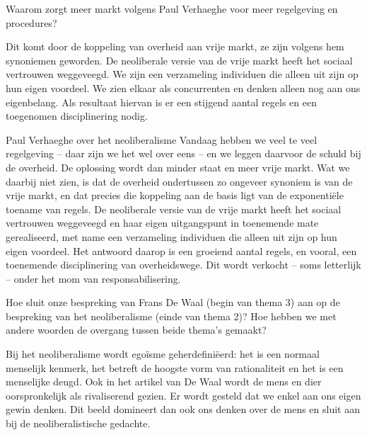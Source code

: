 \documentclass[main.tex]{subfiles}
\begin{document}
\begin{examenvraag}

    \begin{vraag}
        Waarom zorgt meer markt volgens Paul Verhaeghe voor meer regelgeving en procedures?
    \end{vraag}

    \begin{antwoord}
    Dit komt door de koppeling van overheid aan vrije markt, ze zijn volgens hem 
    synoniemen geworden. De neoliberale versie van de vrije markt heeft het 
    sociaal vertrouwen weggeveegd. We zijn een verzameling individuen die alleen 
    uit zijn op hun eigen voordeel.
    We zien elkaar als concurrenten en denken alleen nog aan ons eigenbelang.‭ 
    ‬Als resultaat hiervan is er een stijgend aantal regels en een toegenomen 
    disciplinering nodig.
    \end{antwoord}
    
    \begin{citaat}{Paul Verhaeghe over het neoliberalisme}
	Vandaag hebben we veel te veel regelgeving – daar zijn we het wel
	over eens – en we leggen daarvoor de schuld bij de overheid. De oplossing 
	wordt dan minder staat en meer vrije markt. Wat we daarbij niet zien, is dat 	
	de overheid ondertussen zo ongeveer synoniem is van de vrije markt, en dat 
	precies die koppeling aan de basis ligt van de exponentiële toename van
	regels. De neoliberale versie van de vrije markt heeft het sociaal vertrouwen 
	weggeveegd en haar eigen uitgangspunt in toenemende mate gerealiseerd, met 
	name een verzameling individuen die alleen uit zijn op hun eigen voordeel. Het 
	antwoord daarop is een groeiend aantal regels, en vooral, een
	toenemende disciplinering van overheidswege. Dit wordt verkocht – soms
	letterlijk – onder het mom van responsabilisering.
    \end{citaat}
\end{examenvraag}


\begin{examenvraag}
    \begin{vraag}
        Hoe sluit onze bespreking van Frans De Waal (begin van thema 3) aan op de bespreking van het neoliberalisme (einde van thema 2)? Hoe hebben we met andere woorden de overgang tussen beide thema’s gemaakt?
    \end{vraag}

    \begin{antwoord}
    Bij het neoliberalisme wordt egoïsme geherdefiniëerd:‭ ‬het is een normaal menselijk kenmerk,‭ ‬het 
    betreft de hoogste vorm van rationaliteit en het is een menselijke deugd.‭ ‬Ook in het artikel 
    van De Waal wordt de mens en dier oorspronkelijk als rivaliserend gezien.‭ ‬Er wordt gesteld dat 
    we‭ ‬enkel aan ons eigen gewin denken.‭ ‬Dit‭ ‬beeld domineert dan ook ons denken over de mens en 
    sluit aan bij de neoliberalistische gedachte.
    \end{antwoord}
\end{examenvraag}
\end{document}
